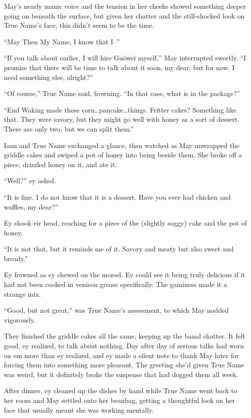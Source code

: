 May's nearly manic voice and the tension in her cheeks showed something deeper going on beneath the surface, but given her chatter and the still-shocked look on True Name's face, this didn't seem to be the time.

``May Then My Name, I know that I--''

``If you talk about earlier, I will hire Guōweī myself,'' May interrupted sweetly. ``I promise that there will be time to talk about it soon, my dear, but for now, I need something else, alright?''

``Of course,'' True Name said, frowning. ``In that case, what is in the package?''

``End Waking made these corn\ldots pancake\ldots things. Fritter cakes? Something like that. They were savory, but they might go well with honey as a sort of dessert. There are only two, but we can split them.''

Ioan and True Name exchanged a glance, then watched as May unwrapped the griddle cakes and swiped a pot of honey into being beside them. She broke off a piece, drizzled honey on it, and ate it.

``Well?'' ey asked.

``It is fine. I do not know that it is a dessert. Have you ever had chicken and waffles, my dear?''

Ey shook eir head, reaching for a piece of the (slightly soggy) cake and the pot of honey.

``It is not that, but it reminds me of it. Savory and meaty but also sweet and bready.''

Ey frowned as ey chewed on the morsel. Ey could see it being truly delicious if it had not been cooked in venison grease specifically. The gaminess made it a strange mix.

``Good, but not great,'' was True Name's assessment, to which May nodded vigorously.

They finished the griddle cakes all the same, keeping up the banal chatter. It felt good, ey realized, to talk about nothing. Day after day of serious talks had worn on em more than ey realized, and ey made a silent note to thank May later for forcing them into something more pleasant. The greeting she'd given True Name was weird, but it definitely broke the suspense that had dogged them all week.

After dinner, ey cleaned up the dishes by hand while True Name went back to her room and May settled onto her beanbag, getting a thoughtful look on her face that usually meant she was working mentally.

